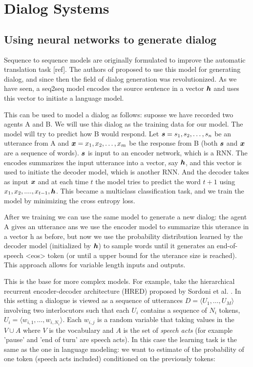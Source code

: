 \chapter{Dialog Systems}
\label{ch:03-dialog-systems}


\section{Using neural networks to generate dialog}
\label{ch:03-gen}

Sequence to sequence models are originally formulated to improve the automatic translation task [ref]. The authors of \cite{DBLP:journals/corr/VinyalsL15} proposed to use this model for generating dialog, and since then the field of dialog generation was revolutionized. As we have seen, a seq2seq model encodes the source sentence in a vector $\bm{h}$ and uses this vector to initiate a language model.

This can be used to model a dialog as follows: suposse we have recorded two agents A and B. We will use this dialog as the training data for our model. The model will try to predict how B would respond. Let $\bm{s} = s_1, s_2, \dots, s_n$ be an utterance from A and  $\bm{x} = x_1, x_2, \dots, x_m$ be the response from B (both $\bm{s}$ and $\bm{x}$ are a sequence of words). $\bm{s}$ is input to an encoder network, which is a RNN. The encodes summarizes the input utterance into a vector, say $\bm{h}$, and this vector is used to initiate the decoder model, which is another RNN. And the decoder takes as input $\bm{x}$ and at each time $t$ the model tries to predict the word $t+1$ using $x_1, x_2, ...., x_{t-1}, \bm{h}$. This became a multiclass classification task, and we train the model by minimizing the cross entropy loss.


After we training we can use the same model to generate a new dialog: the agent A gives an utterance ans we use the encoder model to summarize this uterance in a vector h as before, but now we use the probability distribution learned by the decoder model (initialized by $\bm{h}$) to sample words until it generates an end-of-speech <eos> token (or until a upper bound for the uterance size is reached). This approach allows for variable length inputs and outputs.

This is the base for more complex models. For example, take the hierarchical recurrent encoder-decoder architecture (HRED) proposed by Sordoni et al. \cite{Serban:2016a}. In this setting a dialogue is viewed as a sequence of utterances $D=\langle U_1 , \dots, U_M \rangle$ involving two interlocutors such that each $U_i$ contains a sequence of $N_i$ tokens, $U_i = \langle w_{i,1} , \dots, w_{i,N_{i}} \rangle$. Each $w_{i,j}$ is a random variable that taking values in the $V\cup A$ where $V$ is the vocabulary and $A$ is the set of \textit{speech acts} (for example 'pause' and 'end of turn' are  speech acts). In this case the learning task is the same as the one in language modeling: we want to estimate of the probability of one token (speech acts included) conditioned on the previously tokens:


